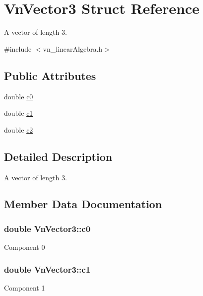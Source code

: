 \hypertarget{structVnVector3}{}\section{Vn\+Vector3 Struct Reference}
\label{structVnVector3}


A vector of length 3.  




{\ttfamily \#include $<$vn\+\_\+linear\+Algebra.\+h$>$}

\subsection*{Public Attributes}
\begin{DoxyCompactItemize}
\item 
double \hyperlink{structVnVector3_a163b7b349fef4d9915cb33cea25761f8}{c0}
\item 
double \hyperlink{structVnVector3_a5fce8b5246d3e3248f84f87eda2e7cf8}{c1}
\item 
double \hyperlink{structVnVector3_ad3debccb37ce62a08ce824f9bf487f3a}{c2}
\end{DoxyCompactItemize}


\subsection{Detailed Description}
A vector of length 3. 

\subsection{Member Data Documentation}
\subsubsection[{\texorpdfstring{c0}{c0}}]{\setlength{\rightskip}{0pt plus 5cm}double Vn\+Vector3\+::c0}\hypertarget{structVnVector3_a163b7b349fef4d9915cb33cea25761f8}{}\label{structVnVector3_a163b7b349fef4d9915cb33cea25761f8}
Component 0 
\subsubsection[{\texorpdfstring{c1}{c1}}]{\setlength{\rightskip}{0pt plus 5cm}double Vn\+Vector3\+::c1}\hypertarget{structVnVector3_a5fce8b5246d3e3248f84f87eda2e7cf8}{}\label{structVnVector3_a5fce8b5246d3e3248f84f87eda2e7cf8}
Component 1 
